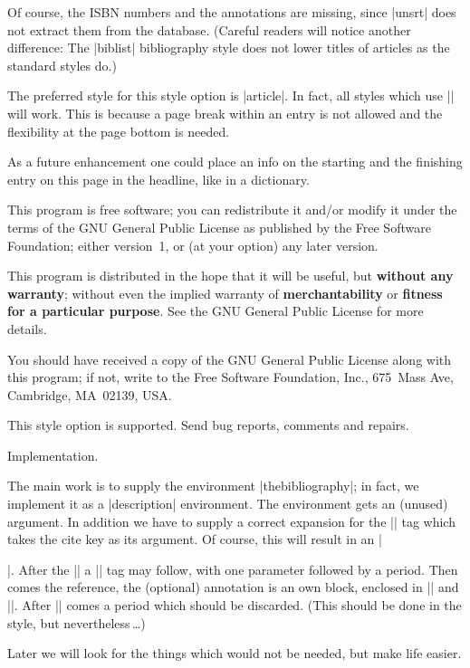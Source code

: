 Of course, the ISBN numbers and the annotations are missing, since
|unsrt| does not extract them from the database. (Careful readers
will notice another difference: The |biblist| bibliography style does
not lower titles of articles as the standard styles do.)


\sect The preferred style for this style option is |article|. In fact,
all styles which use |\raggedbottom| will work. This is because a page
break within an entry is not allowed and the flexibility at the page
bottom is needed.


\sect As a future enhancement one could place an info on the starting
and the finishing entry on this page in the headline, like in a
dictionary.


\sect This program is free software; you can redistribute it and/or
modify it under the terms of the GNU General Public License as
published by the Free Software Foundation; either version~1, or (at your
option) any later version.

This program is distributed in the hope that it will be useful, but
{\bf without any warranty\/}; without even the implied warranty of
{\bf merchantability\/} or {\bf fitness for a particular purpose}.  See
the GNU General Public License for more details.

You should have received a copy of the GNU General Public License
along with this program; if not, write to the Free Software Foundation,
Inc., 675~Mass Ave, Cambridge, MA~02139, USA.


\sect This style option is supported. Send bug reports, comments and
repairs.




\chap Implementation.

The main work is to supply the environment |thebibliography|; in
fact, we implement it as a |description| environment. The environment
gets an (unused) argument. In addition we have to supply a correct
expansion for the |\bibitem| tag which takes the cite key as its
argument. Of course, this will result in an |\item|. After the
|\bibitem| a |\library| tag may follow, with one parameter followed
by a period. Then comes the reference, the (optional) annotation is
an own block, enclosed in |\annote| and |\endannote|. After
|\endannote| comes a period which should be discarded. (This should
be done in the \BibTeX{} style, but nevertheless\,\dots)

Later we will look for the things which would not be needed, but make
life easier.


